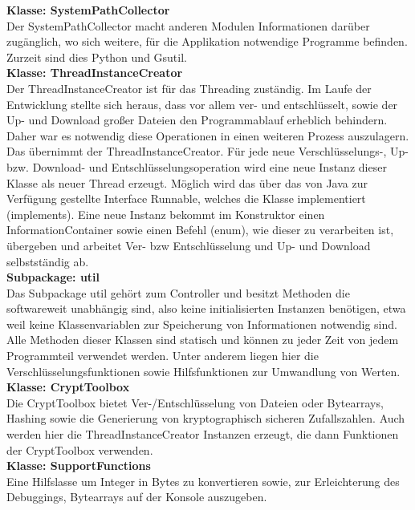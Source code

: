 \documentclass[12pt,a4paper,bibliography=totocnumbered,listof=totocnumbered]{scrartcl}
\begin{document}
\textbf{Klasse: SystemPathCollector}\\
Der SystemPathCollector macht anderen Modulen Informationen darüber zugänglich, wo sich weitere, für die Applikation notwendige Programme befinden. Zurzeit sind dies Python und Gsutil.\\
\textbf{Klasse: ThreadInstanceCreator}\\
Der ThreadInstanceCreator ist für das Threading zuständig. Im Laufe der Entwicklung stellte sich heraus, dass vor allem ver- und entschlüsselt, sowie der Up- und Download großer Dateien den Programmablauf erheblich behindern. Daher war es notwendig diese Operationen in einen weiteren Prozess auszulagern. Das übernimmt der ThreadInstanceCreator. Für jede neue Verschlüsselungs-, Up- bzw. Download- und Entschlüsselungsoperation wird eine neue Instanz dieser Klasse als neuer Thread erzeugt. Möglich wird das über das von Java zur Verfügung gestellte Interface Runnable, welches die Klasse implementiert (implements). Eine neue Instanz bekommt im Konstruktor einen InformationContainer sowie einen Befehl (enum), wie dieser zu verarbeiten ist, übergeben und arbeitet Ver- bzw Entschlüsselung und Up- und Download selbstständig ab.\\
\textbf{Subpackage: util}\\
Das Subpackage util gehört zum Controller und besitzt Methoden die softwareweit unabhängig sind, also keine initialisierten Instanzen benötigen, etwa weil keine Klassenvariablen zur Speicherung von Informationen notwendig sind. Alle Methoden dieser Klassen sind statisch und können zu jeder Zeit von jedem Programmteil verwendet werden. Unter anderem liegen hier die Verschlüsselungsfunktionen sowie Hilfsfunktionen zur Umwandlung von Werten. \\
\textbf{Klasse: CryptToolbox}\\
Die CryptToolbox bietet Ver-/Entschlüsselung von Dateien oder Bytearrays, Hashing sowie die Generierung von kryptographisch sicheren Zufallszahlen. Auch werden hier die ThreadInstanceCreator Instanzen erzeugt, die dann Funktionen der CryptToolbox verwenden.\\
\textbf{Klasse: SupportFunctions}\\
Eine Hilfslasse um Integer in Bytes zu konvertieren sowie, zur Erleichterung des Debuggings, Bytearrays auf der Konsole auszugeben.\\
\end{document}
